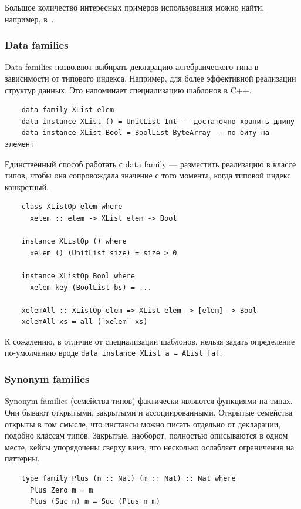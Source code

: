 Большое количество интересных примеров использования можно найти, например, в~\cite{kiselyov2010fun}.

\subsubsection{Data families}

Data families позволяют выбирать декларацию алгебраического типа в зависимости от типового индекса.
Например, для более эффективной реализации структур данных.
Это напоминает специализацию шаблонов в C++.

\begin{verbatim}
    data family XList elem
    data instance XList () = UnitList Int -- достаточно хранить длину
    data instance XList Bool = BoolList ByteArray -- по биту на элемент
\end{verbatim}

Единственный способ работать с data family --- разместить реализацию в классе типов, чтобы она сопровождала значение с того момента, когда типовой индекс конкретный.

\begin{verbatim}
    class XListOp elem where
      xelem :: elem -> XList elem -> Bool

    instance XListOp () where
      xelem () (UnitList size) = size > 0

    instance XListOp Bool where
      xelem key (BoolList bs) = ...

    xelemAll :: XListOp elem => XList elem -> [elem] -> Bool
    xelemAll xs = all (`xelem` xs)
\end{verbatim}

К сожалению, в отличие от специализации шаблонов, нельзя задать определение по-умолчанию вроде \texttt{data instance XList a = AList [a]}.

\subsubsection{Synonym families}

Synonym families (семейства типов) фактически являются функциями на типах.
Они бывают открытыми, закрытыми и ассоциированными.
Открытые семейства открыты в том смысле, что инстансы можно писать отдельно от декларации, подобно классам типов.
Закрытые, наоборот, полностью описываются в одном месте, кейсы упорядочены сверху вниз, что несколько ослабляет ограничения на паттерны.

\begin{verbatim}
    type family Plus (n :: Nat) (m :: Nat) :: Nat where
      Plus Zero m = m
      Plus (Suc n) m = Suc (Plus n m)
\end{verbatim}

